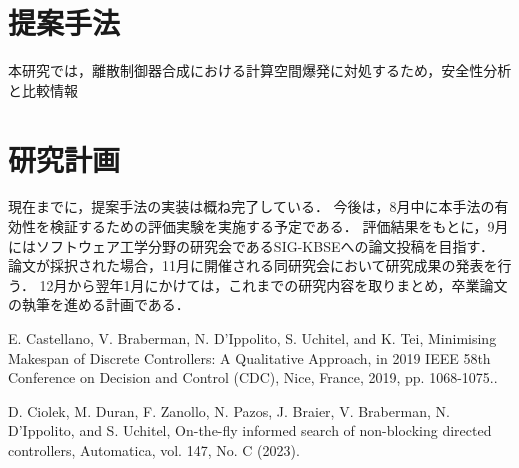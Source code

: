 \documentclass[11pt]{jarticle}
\begin{document}

\section{提案手法}
本研究では，離散制御器合成における計算空間爆発に対処するため，安全性分析と比較情報



\section{研究計画}
現在までに，提案手法の実装は概ね完了している．
今後は，8月中に本手法の有効性を検証するための評価実験を実施する予定である．
評価結果をもとに，9月にはソフトウェア工学分野の研究会であるSIG-KBSEへの論文投稿を目指す．
論文が採択された場合，11月に開催される同研究会において研究成果の発表を行う．
12月から翌年1月にかけては，これまでの研究内容を取りまとめ，卒業論文の執筆を進める計画である．


\begin{thebibliography}{99} %
{\footnotesize

E. Castellano, V. Braberman, N. D'Ippolito, S. Uchitel, and K. Tei, 
Minimising Makespan of Discrete Controllers: A Qualitative Approach,
in 2019 IEEE 58th
Conference on Decision and Control (CDC), Nice, France, 2019, pp. 1068-1075..

D. Ciolek, M. Duran, F. Zanollo, N. Pazos, J. Braier, V. Braberman, N. D'Ippolito, and S.
Uchitel, On-the-fly informed search of non-blocking directed controllers,
Automatica, vol. 147, No. C (2023).

}
\end{thebibliography} %

\end{document}

